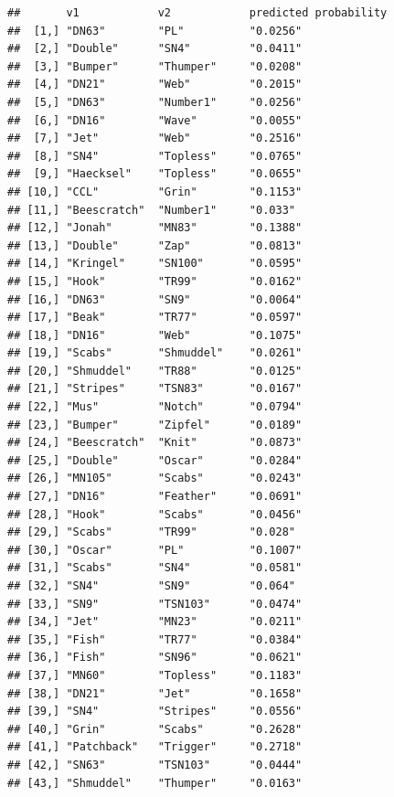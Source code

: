 \documentclass[]{article}
\begin{document}
\begin{verbatim}
##       v1            v2            predicted probability
##  [1,] "DN63"        "PL"          "0.0256"             
##  [2,] "Double"      "SN4"         "0.0411"             
##  [3,] "Bumper"      "Thumper"     "0.0208"             
##  [4,] "DN21"        "Web"         "0.2015"             
##  [5,] "DN63"        "Number1"     "0.0256"             
##  [6,] "DN16"        "Wave"        "0.0055"             
##  [7,] "Jet"         "Web"         "0.2516"             
##  [8,] "SN4"         "Topless"     "0.0765"             
##  [9,] "Haecksel"    "Topless"     "0.0655"             
## [10,] "CCL"         "Grin"        "0.1153"             
## [11,] "Beescratch"  "Number1"     "0.033"              
## [12,] "Jonah"       "MN83"        "0.1388"             
## [13,] "Double"      "Zap"         "0.0813"             
## [14,] "Kringel"     "SN100"       "0.0595"             
## [15,] "Hook"        "TR99"        "0.0162"             
## [16,] "DN63"        "SN9"         "0.0064"             
## [17,] "Beak"        "TR77"        "0.0597"             
## [18,] "DN16"        "Web"         "0.1075"             
## [19,] "Scabs"       "Shmuddel"    "0.0261"             
## [20,] "Shmuddel"    "TR88"        "0.0125"             
## [21,] "Stripes"     "TSN83"       "0.0167"             
## [22,] "Mus"         "Notch"       "0.0794"             
## [23,] "Bumper"      "Zipfel"      "0.0189"             
## [24,] "Beescratch"  "Knit"        "0.0873"             
## [25,] "Double"      "Oscar"       "0.0284"             
## [26,] "MN105"       "Scabs"       "0.0243"             
## [27,] "DN16"        "Feather"     "0.0691"             
## [28,] "Hook"        "Scabs"       "0.0456"             
## [29,] "Scabs"       "TR99"        "0.028"              
## [30,] "Oscar"       "PL"          "0.1007"             
## [31,] "Scabs"       "SN4"         "0.0581"             
## [32,] "SN4"         "SN9"         "0.064"              
## [33,] "SN9"         "TSN103"      "0.0474"             
## [34,] "Jet"         "MN23"        "0.0211"             
## [35,] "Fish"        "TR77"        "0.0384"             
## [36,] "Fish"        "SN96"        "0.0621"             
## [37,] "MN60"        "Topless"     "0.1183"             
## [38,] "DN21"        "Jet"         "0.1658"             
## [39,] "SN4"         "Stripes"     "0.0556"             
## [40,] "Grin"        "Scabs"       "0.2628"             
## [41,] "Patchback"   "Trigger"     "0.2718"             
## [42,] "SN63"        "TSN103"      "0.0444"             
## [43,] "Shmuddel"    "Thumper"     "0.0163"             

\end{verbatim}
\end{document}
